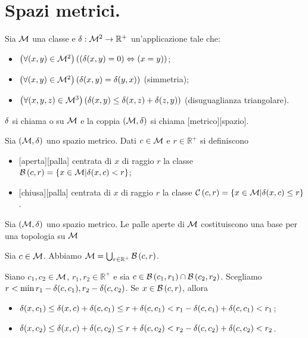 \section{Spazi metrici.}\label{SpaziMetrici}
\begin{Definition}
	Sia $\mathcal{M}$ una classe e $\delta:
\mathcal{M}^2 \rightarrow \mathbb{R}^+$ un'applicazione
tale che:
	\begin{itemize}
		\item $\left ( \forall (x,y) \in \mathcal{M}^2 \right ) \left ( 
		\left ( \delta(x,y) = 0 \right ) \Leftrightarrow \left ( x = y \right ) \right )$;
		\item $\left ( \forall (x,y) \in \mathcal{M}^2 \right ) \left ( 
		\delta(x,y) = \delta(y,x) \right )$ (simmetria);
		\item $\left ( \forall (x,y,z) \in \mathcal{M}^3 \right ) \left ( 
		\delta(x,y) \leq \delta(x,z) + \delta(z,y) \right )$
		(disuguaglianza triangolare).
	\end{itemize}
	$\delta$ si chiama  o  su
	$\mathcal{M}$ e la coppia $(\mathcal{M},\delta)$ si chiama
	[metrico][spazio].
\end{Definition}
\begin{Definition}
	Sia $(\mathcal{M},\delta)$ uno spazio metrico. Dati $c \in
	\mathcal{M}$ e $r \in \mathbb{R}^+$ si definiscono
	\begin{itemize}
		\item {}[aperta][palla] centrata di $x$ di raggio $r$
	la classe $\mathcal{B}\left (c,r \right) = \lbrace x \in \mathcal{M} |
	\delta(x,c) < r \rbrace$;
		\item {}[chiusa][palla] centrata di $x$ di raggio $r$
	la classe $\mathcal{C}\left (c,r \right) = \lbrace x \in \mathcal{M} |
	\delta(x,c) \leq r \rbrace$.
	\end{itemize}
\end{Definition}
\begin{Theorem}
	Sia $(\mathcal{M},\delta)$ uno spazio metrico.
	Le palle aperte di $\mathcal{M}$ costituiscono una base per una
	topologia su $\mathcal{M}$
\end{Theorem}
\Proof Sia $c \in \mathcal{M}$. Abbiamo $\mathcal{M} =
\bigcup_{r \in \mathbb{R}^+} \mathcal{B}\left (c,r \right)$.
\par Siano $c_1, c_2 \in \mathcal{M}$, $r_1, r_2 \in \mathbb{R}^+$ e sia
$c \in \mathcal{B}\left (c_1,r_1 \right) \cap \mathcal{B}\left (c_2,r_2 \right)$. Scegliamo
$r < \min{r_1 - \delta(c,c_1),r_2 - \delta(c,c_2)}$.
Se $x \in \mathcal{B}\left (c,r \right)$, allora
\begin{itemize}
	\item $\delta(x,c_1) \leq \delta(x,c) + \delta(c,c_1)
	\leq r + \delta(c,c_1)
	< r_1 - \delta(c,c_1) + \delta(c,c_1)
	< r_1$;
	\item $\delta(x,c_2) \leq \delta(x,c) + \delta(c,c_2)
	\leq r + \delta(c,c_2)
	< r_2 - \delta(c,c_2) + \delta(c,c_2)
	< r_2$.
\end{itemize}
